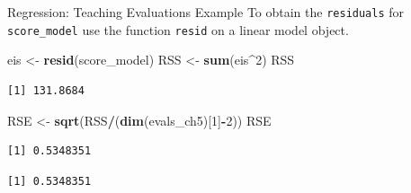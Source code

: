 \documentclass[
  ignorenonframetext,
]{beamer}
\newenvironment{Shaded}{\begin{snugshade}}{\end{snugshade}}
\newcommand{\CommentTok}[1]{\textcolor[rgb]{0.56,0.35,0.01}{\textit{#1}}}
\newcommand{\DecValTok}[1]{\textcolor[rgb]{0.00,0.00,0.81}{#1}}
\newcommand{\FunctionTok}[1]{\textcolor[rgb]{0.13,0.29,0.53}{\textbf{#1}}}
\newcommand{\NormalTok}[1]{#1}
\newcommand{\OtherTok}[1]{\textcolor[rgb]{0.56,0.35,0.01}{#1}}
\newcommand{\SpecialCharTok}[1]{\textcolor[rgb]{0.81,0.36,0.00}{\textbf{#1}}}
\begin{document}
\begin{frame}[fragile]{Regression: Teaching Evaluations Example}
\label{regression-teaching-evaluations-example-9}
To obtain the \texttt{residuals} for \texttt{score\_model} use the
function \texttt{resid} on a linear model object.

\normalsize

\begin{Shaded}
\begin{Highlighting}[]
\NormalTok{eis }\OtherTok{\textless{}{-}} \FunctionTok{resid}\NormalTok{(score\_model)}
\NormalTok{RSS }\OtherTok{\textless{}{-}} \FunctionTok{sum}\NormalTok{(eis}\SpecialCharTok{\^{}}\DecValTok{2}\NormalTok{)}
\NormalTok{RSS}
\end{Highlighting}
\end{Shaded}

\begin{verbatim}
[1] 131.8684
\end{verbatim}

\begin{Shaded}
\begin{Highlighting}[]
\NormalTok{RSE }\OtherTok{\textless{}{-}} \FunctionTok{sqrt}\NormalTok{(RSS}\SpecialCharTok{/}\NormalTok{(}\FunctionTok{dim}\NormalTok{(evals\_ch5)[}\DecValTok{1}\NormalTok{]}\SpecialCharTok{{-}}\DecValTok{2}\NormalTok{))}
\NormalTok{RSE}
\end{Highlighting}
\end{Shaded}

\begin{verbatim}
[1] 0.5348351
\end{verbatim}

\begin{Shaded}
\end{Shaded}

\begin{verbatim}
[1] 0.5348351
\end{verbatim}

\normalsize
\end{frame}
\end{document}
